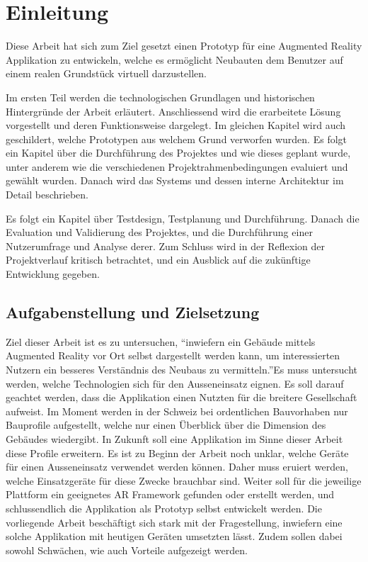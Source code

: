 \documentclass[a4paper]{scrreprt}
\begin{document}
\tableofcontents

\clearpage
{}
\chapter{Einleitung}
Diese Arbeit hat sich zum Ziel gesetzt einen Prototyp für eine Augmented Reality Applikation zu entwickeln, welche es ermöglicht Neubauten dem Benutzer auf einem realen Grundstück virtuell darzustellen.

Im ersten Teil werden die technologischen Grundlagen und historischen Hintergründe der Arbeit erläutert. Anschliessend wird die erarbeitete Lösung vorgestellt und deren Funktionsweise dargelegt. Im gleichen Kapitel wird auch geschildert, welche Prototypen aus welchem Grund verworfen wurden. Es folgt ein Kapitel über die Durchführung des Projektes und wie dieses geplant wurde, unter anderem wie die verschiedenen Projektrahmenbedingungen evaluiert und gewählt wurden. Danach wird das Systems und dessen interne Architektur im Detail beschrieben.

Es folgt ein Kapitel über Testdesign, Testplanung und Durchführung. Danach die Evaluation und Validierung des Projektes, und die Durchführung einer Nutzerumfrage und Analyse derer. Zum Schluss wird in der Reflexion der Projektverlauf kritisch betrachtet, und ein Ausblick auf die zukünftige Entwicklung gegeben.

\section{Aufgabenstellung und Zielsetzung}
Ziel dieser Arbeit ist es zu untersuchen, \textquotedblleft inwiefern ein Gebäude mittels Augmented Reality vor Ort selbst dargestellt werden kann, um interessierten Nutzern ein besseres Verständnis des Neubaus zu vermitteln.\textquotedblright Es muss untersucht werden, welche Technologien sich für den Ausseneinsatz eignen. Es soll darauf geachtet werden, dass die Applikation einen Nutzten für die breitere Gesellschaft aufweist. Im Moment werden in der Schweiz bei ordentlichen Bauvorhaben nur Bauprofile aufgestellt, welche nur einen Überblick über die Dimension des Gebäudes wiedergibt. In Zukunft soll eine Applikation im Sinne dieser Arbeit diese Profile erweitern.
\bigbreak
Es ist zu Beginn der Arbeit noch unklar, welche Geräte für einen Ausseneinsatz verwendet werden können. Daher muss eruiert werden, welche Einsatzgeräte für diese Zwecke brauchbar sind. Weiter soll für die jeweilige Plattform ein geeignetes AR Framework gefunden oder erstellt werden, und schlussendlich die Applikation als Prototyp selbst entwickelt werden.
\bigbreak
Die vorliegende Arbeit beschäftigt sich stark mit der Fragestellung, inwiefern eine solche Applikation mit heutigen Geräten umsetzten lässt. Zudem sollen dabei sowohl Schwächen, wie auch Vorteile aufgezeigt werden.
\end{document}
